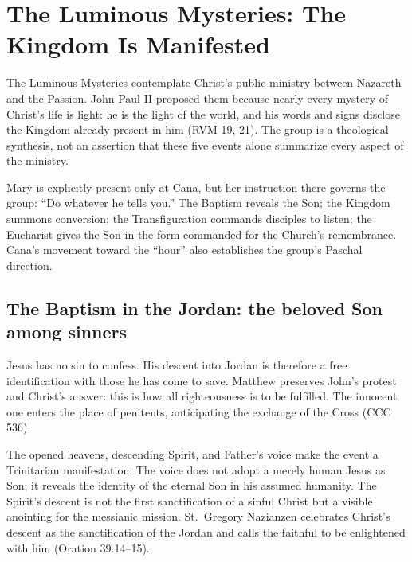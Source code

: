 \section{The Luminous Mysteries: The Kingdom Is Manifested}

The Luminous Mysteries contemplate Christ's public ministry between Nazareth and the Passion. John Paul II proposed them because nearly every mystery of Christ's life is light: he is the light of the world, and his words and signs disclose the Kingdom already present in him (RVM 19, 21). The group is a theological synthesis, not an assertion that these five events alone summarize every aspect of the ministry.

Mary is explicitly present only at Cana, but her instruction there governs the group: ``Do whatever he tells you.'' The Baptism reveals the Son; the Kingdom summons conversion; the Transfiguration commands disciples to listen; the Eucharist gives the Son in the form commanded for the Church's remembrance. Cana's movement toward the ``hour'' also establishes the group's Paschal direction.

\subsection{The Baptism in the Jordan: the beloved Son among sinners}


Jesus has no sin to confess. His descent into Jordan is therefore a free identification with those he has come to save. Matthew preserves John's protest and Christ's answer: this is how all righteousness is to be fulfilled. The innocent one enters the place of penitents, anticipating the exchange of the Cross (CCC 536).

The opened heavens, descending Spirit, and Father's voice make the event a Trinitarian manifestation. The voice does not adopt a merely human Jesus as Son; it reveals the identity of the eternal Son in his assumed humanity. The Spirit's descent is not the first sanctification of a sinful Christ but a visible anointing for the messianic mission. St.~Gregory Nazianzen celebrates Christ's descent as the sanctification of the Jordan and calls the faithful to be enlightened with him (Oration 39.14--15).

